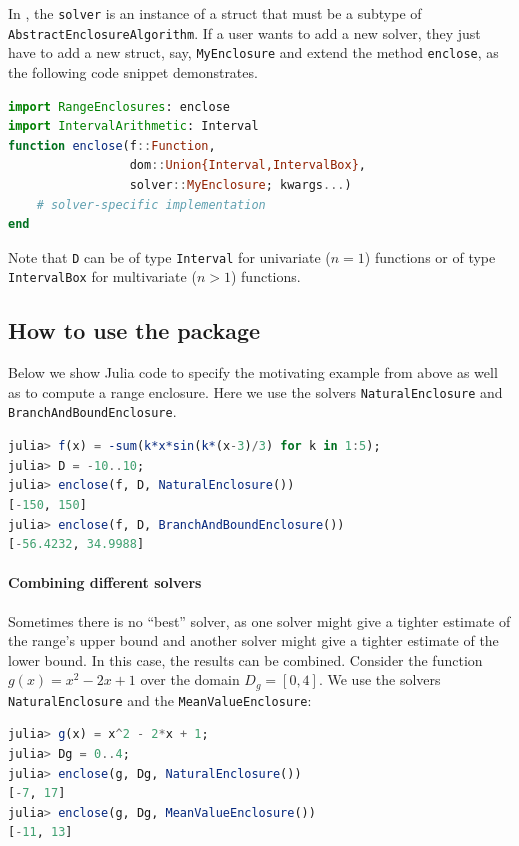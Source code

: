 \documentclass{juliacon}
\begin{document}
In \emph{\RE}, the \texttt{solver} is an instance of a struct that must be a subtype of \texttt{AbstractEnclosureAlgorithm}.
If a user wants to add a new solver, they just have to add a new struct, say, \texttt{MyEnclosure} and extend the method \texttt{enclose}, as the following code snippet demonstrates.
%
\vspace*{-3mm}
\begin{lstlisting}[language=Julia]
import RangeEnclosures: enclose
import IntervalArithmetic: Interval
function enclose(f::Function,
                 dom::Union{Interval,IntervalBox},
                 solver::MyEnclosure; kwargs...)
    # solver-specific implementation
end
\end{lstlisting}
\vspace*{-3mm}

Note that \texttt{D} can be of type \texttt{Interval} for univariate ($n = 1$) functions or of type \texttt{IntervalBox} for multivariate ($n > 1$) functions.


\subsection{How to use the package}

Below we show Julia code to specify the motivating example from above as well as to compute a range enclosure. Here we use the solvers \texttt{NaturalEnclosure} and \texttt{BranchAndBoundEnclosure}.

\begin{lstlisting}[language=Julia]
julia> f(x) = -sum(k*x*sin(k*(x-3)/3) for k in 1:5);
julia> D = -10..10;
julia> enclose(f, D, NaturalEnclosure())
[-150, 150]
julia> enclose(f, D, BranchAndBoundEnclosure())
[-56.4232, 34.9988]
\end{lstlisting}


\paragraph*{Combining different solvers}

Sometimes there is no ``best'' solver, as one solver might give a tighter estimate of the range's upper bound and another solver might give a tighter estimate of the lower bound. In this case, the results can be combined. Consider the function $g(x) = x^2 - 2x + 1$ over the domain $D_g = [0, 4]$. We use the solvers \texttt{NaturalEnclosure} and the \texttt{MeanValueEnclosure}:

\begin{lstlisting}[language=Julia]
julia> g(x) = x^2 - 2*x + 1;
julia> Dg = 0..4;
julia> enclose(g, Dg, NaturalEnclosure())
[-7, 17]
julia> enclose(g, Dg, MeanValueEnclosure())
[-11, 13]
\end{lstlisting}
\end{document}
